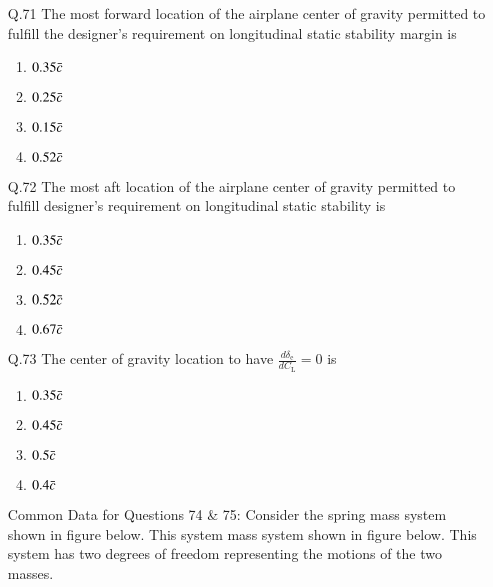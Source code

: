 \documentclass[journal]{IEEEtran}
\begin{document}
\begin{enumerate}
\item[Q.71] The most forward location of the airplane  center of gravity permitted to fulfill the designer's requirement on longitudinal static stability margin is
\begin{enumerate}
    \item $0.35 \Bar{c}$
    \item $0.25 \Bar{c}$
    \item $0.15 \Bar{c}$
    \item $0.52 \Bar{c}$\\
\end{enumerate}
\item[Q.72] The most aft location of the airplane center of gravity permitted to fulfill designer's requirement on longitudinal static stability is
\begin{enumerate}
    \item $0.35 \Bar{c}$
    \item $0.45 \Bar{c}$
    \item $0.52 \Bar{c}$
    \item $0.67 \Bar{c}$\\
\end{enumerate}
\item[Q.73]The center of gravity location to have $\frac{d\delta_{\text{e}}}{dC_{\text{L}}} = 0$ is
\begin{enumerate}
    \item $0.35 \Bar{c}$
    \item $0.45 \Bar{c}$
    \item $0.5 \Bar{c}$
    \item $0.4 \Bar{c}$\\ 
\end{enumerate}
Common Data for Questions 74 \& 75: Consider the spring mass system shown in figure below. This system mass system shown in figure below. This system has two degrees of freedom representing the motions of the two masses. 


\end{enumerate}
\end{document}
